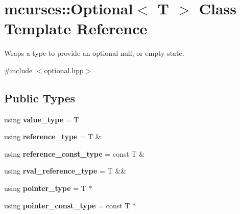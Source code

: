\hypertarget{classmcurses_1_1Optional}{}\section{mcurses\+:\+:Optional$<$ T $>$ Class Template Reference}
\label{classmcurses_1_1Optional}


Wraps a type to provide an optional \textquotesingle{}null\textquotesingle{}, or empty state.  




{\ttfamily \#include $<$optional.\+hpp$>$}

\subsection*{Public Types}
\begin{DoxyCompactItemize}
\item 
\hypertarget{classmcurses_1_1Optional_acde60baa6c9d0875b94825e979eda49c}{}\label{classmcurses_1_1Optional_acde60baa6c9d0875b94825e979eda49c} 
using {\bfseries value\+\_\+type} = T
\item 
\hypertarget{classmcurses_1_1Optional_ab9bbf1c6e9076968c95a185a02a264fc}{}\label{classmcurses_1_1Optional_ab9bbf1c6e9076968c95a185a02a264fc} 
using {\bfseries reference\+\_\+type} = T \&
\item 
\hypertarget{classmcurses_1_1Optional_ad890e95fb87a634a20be4c303667dcf8}{}\label{classmcurses_1_1Optional_ad890e95fb87a634a20be4c303667dcf8} 
using {\bfseries reference\+\_\+const\+\_\+type} = const T \&
\item 
\hypertarget{classmcurses_1_1Optional_a58c2635e4aa8b4fe4ae1edd119689587}{}\label{classmcurses_1_1Optional_a58c2635e4aa8b4fe4ae1edd119689587} 
using {\bfseries rval\+\_\+reference\+\_\+type} = T \&\&
\item 
\hypertarget{classmcurses_1_1Optional_a8fd6d3594afac4a3e16017a39022db71}{}\label{classmcurses_1_1Optional_a8fd6d3594afac4a3e16017a39022db71} 
using {\bfseries pointer\+\_\+type} = T $\ast$
\item 
\hypertarget{classmcurses_1_1Optional_a0ea30d61700c90c149f241ec16bb585c}{}\label{classmcurses_1_1Optional_a0ea30d61700c90c149f241ec16bb585c} 
using {\bfseries pointer\+\_\+const\+\_\+type} = const T $\ast$
\end{DoxyCompactItemize}
